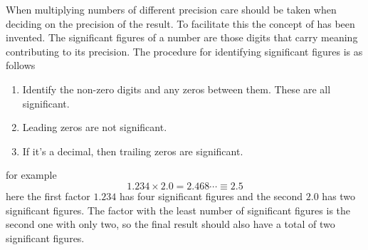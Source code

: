 When multiplying numbers of different precision care should be taken when deciding on the precision of the result. To facilitate this the concept of  has been invented. The significant figures of a number are those digits that carry meaning contributing to its precision. The procedure for identifying significant figures is as follows 
\begin{enumerate}
\item Identify the non-zero digits and any zeros between them. These are all significant.
\item Leading zeros are not significant.
\item If it's a decimal, then trailing zeros are significant.
\end{enumerate}
for example
\[
1.234 \times 2.0 = 2.468\cdots \equiv 2.5
\]
here the first factor $1.234$ has four significant figures and the second $2.0$ has two significant figures. The factor with the least number of significant figures is the second one with only two, so the final result should also have a total of two significant figures.




